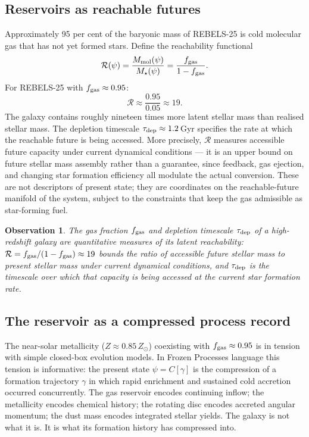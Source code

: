\documentclass[12pt, oneside]{article}
\newtheorem{observation}{Observation}
\begin{document}
\subsection{Reservoirs as reachable futures}

Approximately 95 per cent of the baryonic mass of REBELS-25 is cold molecular gas that has not yet formed stars. Define the reachability functional
\begin{equation}
\mathcal{R}(\psi) = \frac{M_{\rm mol}(\psi)}{M_\star(\psi)} = \frac{f_{\rm gas}}{1 - f_{\rm gas}}.
\end{equation}
For REBELS-25 with $f_{\rm gas} \approx 0.95$:
\begin{equation}
\mathcal{R} \approx \frac{0.95}{0.05} \approx 19.
\end{equation}
The galaxy contains roughly nineteen times more latent stellar mass than realised stellar mass. The depletion timescale $\tau_{\rm dep} \approx 1.2$\,Gyr specifies the rate at which the reachable future is being accessed. More precisely, $\mathcal{R}$ measures accessible future capacity under current dynamical conditions --- it is an upper bound on future stellar mass assembly rather than a guarantee, since feedback, gas ejection, and changing star formation efficiency all modulate the actual conversion. These are not descriptors of present state; they are coordinates on the reachable-future manifold of the system, subject to the constraints that keep the gas admissible as star-forming fuel.

\begin{observation}
The gas fraction $f_{\rm gas}$ and depletion timescale $\tau_{\rm dep}$ of a high-redshift galaxy are quantitative measures of its latent reachability: $\mathcal{R} = f_{\rm gas}/(1 - f_{\rm gas}) \approx 19$ bounds the ratio of accessible future stellar mass to present stellar mass under current dynamical conditions, and $\tau_{\rm dep}$ is the timescale over which that capacity is being accessed at the current star formation rate.
\end{observation}

\subsection{The reservoir as a compressed process record}

The near-solar metallicity ($Z \approx 0.85\,Z_\odot$) coexisting with $f_{\rm gas} \approx 0.95$ is in tension with simple closed-box evolution models. In Frozen Processes language this tension is informative: the present state $\psi = C[\gamma]$ is the compression of a formation trajectory $\gamma$ in which rapid enrichment and sustained cold accretion occurred concurrently. The gas reservoir encodes continuing inflow; the metallicity encodes chemical history; the rotating disc encodes accreted angular momentum; the dust mass encodes integrated stellar yields. The galaxy is not what it is. It is what its formation history has compressed into.
\end{document}
